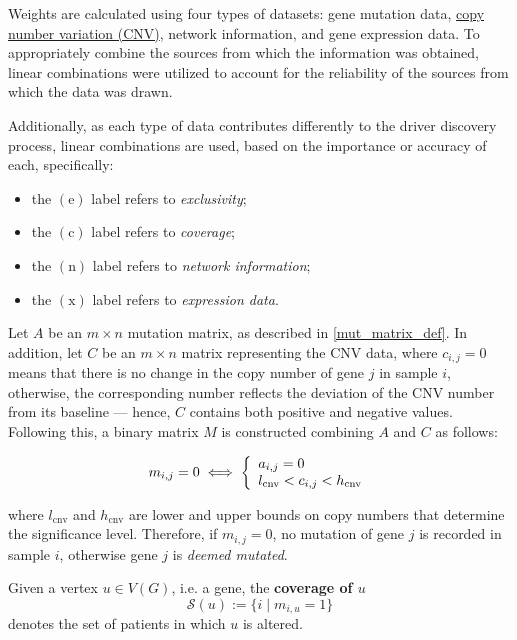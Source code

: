 Weights are calculated using four types of datasets: gene mutation data, \href{https://www.genome.gov/genetics-glossary/Copy-Number-Variation}{copy number variation (CNV)}, network information, and gene expression data. To appropriately combine the sources from which the information was obtained, linear combinations were utilized to account for the reliability of the sources from which the data was drawn.

Additionally, as each type of data contributes differently to the driver discovery process, linear combinations are used, based on the importance or accuracy of each, specifically:

\begin{itemize}
    \item the $(\mathrm e)$ label refers to \textit{exclusivity};
    \item the $(\mathrm c)$ label refers to \textit{coverage};
    \item the $(\mathrm n)$ label refers to \textit{network information};
    \item the $(\mathrm x)$ label refers to \textit{expression data}.
\end{itemize}

Let $A$ be an $m \times n$ mutation matrix, as described in \cref{mut_matrix_def}. In addition, let $C$ be an $m \times n$ matrix representing the CNV data, where $c_{i, j} = 0$ means that there is no change in the copy number of gene $j$ in sample $i$, otherwise, the corresponding number reflects the deviation of the CNV number from its baseline --- hence, $C$ contains both positive and negative values. Following this, a binary matrix $M$ is constructed combining $A$ and $C$ as follows:

\begin{equation}
    m_{i, j} = 0 \iff \soe{l}{a_{i, j} = 0 \\ l_{\mathrm{cnv}} < c_{i, j} < h_{\mathrm{cnv}}}
\end{equation}

where $l_{\mathrm{cnv}}$ and $h_{\mathrm{cnv}}$ are lower and upper bounds on copy numbers that determine the significance level.  Therefore, if $m_{i, j} = 0$, no mutation of gene $j$ is recorded in sample $i$, otherwise gene $j$ is \textit{deemed mutated}.

\begin{definition}
    Given a vertex $u \in V(G)$, i.e. a gene, the \textbf{coverage of $u$} $$\mathscr{S}(u) := \{i \mid m_{i, u} = 1\}$$ denotes the set of patients in which $u$ is altered.
\end{definition}

